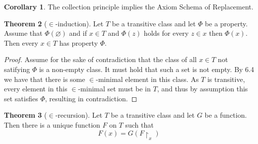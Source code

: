 \documentclass{article}
\theoremstyle{definition}
\newtheorem{thm}{Theorem}[section]
\newtheorem{crly}[thm]{Corollary}
\newcommand*{\mtset}{\ensuremath{\varnothing}}
\begin{document}
\begin{crly}
    The collection principle implies the Axiom Schema of Replacement.
\end{crly}

\begin{thm}[$\in$-induction]
    Let $T$ be a transitive class and let $\Phi$ be a property. Assume that $\Phi(\mtset)$ and if $x \in T$ and $\Phi(z)$ holds for every $z \in x$ then $\Phi(x)$. Then every $x \in T$ has property $\Phi$. 
\end{thm}

\begin{proof}
    Assume for the sake of contradiction that the class of all $x \in T$ not satifying $\Phi$ is a non-empty class. It must hold that such a set is not empty. By 6.4 we have that there is some $\in$-minimal element in this class. As $T$ is transitive, every element in this $\in$-minimal set must be in $T$, and thus by assumption this set satisfies $\Phi$, resulting in contradiction.
\end{proof}

\newpage

\begin{thm}[$\in$-recursion]
    Let $T$ be a transitive class and let $G$ be a function. Then there is a unique function $F$ on $T$ such that 
    \[
        F(x) = G(F\restriction_x)
    \]
\end{thm}
\end{document}
